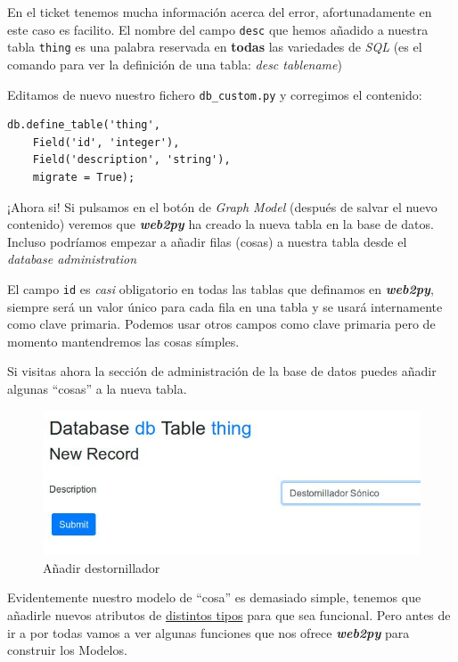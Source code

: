 \documentclass[
  12pt,
  spanish,
]{article}
\begin{document}
En el ticket tenemos mucha información acerca del error, afortunadamente
en este caso es facilito. El nombre del campo \texttt{desc} que hemos
añadido a nuestra tabla \texttt{thing} es una palabra reservada en
\textbf{todas} las variedades de \emph{SQL} (es el comando para ver la
definición de una tabla: \emph{desc tablename})

Editamos de nuevo nuestro fichero \texttt{db\_custom.py} y corregimos el
contenido:

\begin{verbatim}
db.define_table('thing',
    Field('id', 'integer'),
    Field('description', 'string'),
    migrate = True);
\end{verbatim}

¡Ahora si! Si pulsamos en el botón de \emph{Graph Model} (después de
salvar el nuevo contenido) veremos que \textbf{\emph{web2py}} ha creado
la nueva tabla en la base de datos. Incluso podríamos empezar a añadir
filas (cosas) a nuestra tabla desde el \emph{database administration}

El campo \texttt{id} es \emph{casi} obligatorio en todas las tablas que
definamos en \textbf{\emph{web2py}}, siempre será un valor único para
cada fila en una tabla y se usará internamente como clave primaria.
Podemos usar otros campos como clave primaria pero de momento
mantendremos las cosas símples.

Si visitas ahora la sección de administración de la base de datos puedes
añadir algunas ``cosas'' a la nueva tabla.

\begin{figure}
\centering
\includegraphics{src/img/add_thing_a.jpg}
\caption{Añadir destornillador}
\end{figure}

Evidentemente nuestro modelo de ``cosa'' es demasiado simple, tenemos
que añadirle nuevos atributos de
\href{http://web2py.com/books/default/chapter/29/06/the-database-abstraction-layer\#Field-types}{distintos
tipos} para que sea funcional. Pero antes de ir a por todas vamos a ver
algunas funciones que nos ofrece \textbf{\emph{web2py}} para construir
los Modelos.
\end{document}
